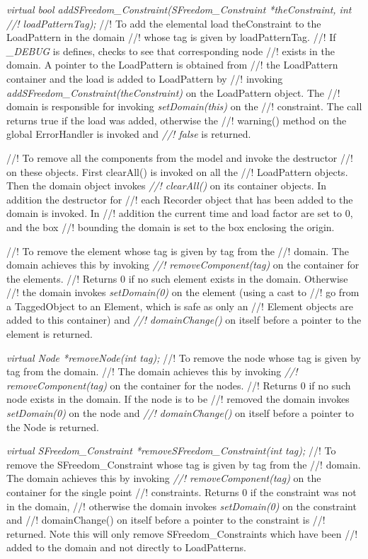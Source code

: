 {\em virtual bool addSFreedom\_Constraint(SFreedom\_Constraint *theConstraint, int
//! loadPatternTag);}    
//! To add the elemental load \p theConstraint to the LoadPattern in the domain
//! whose tag is given by \p loadPatternTag.
//! If {\em \_DEBUG} is defines, checks to see that corresponding node
//! exists in the domain. A pointer to the LoadPattern is obtained from
//! the LoadPattern container and the load is added to LoadPattern by
//! invoking {\em addSFreedom\_Constraint(theConstraint)} on the LoadPattern object. The
//! domain is responsible for invoking {\em setDomain(this)} on the
//! constraint. The call returns \p true if the load was added, otherwise the
//! warning() method on the global ErrorHandler is invoked and {\em
//! false} is returned. 


//! To remove all the components from the model and invoke the destructor
//! on these objects. First clearAll() is invoked on all the
//! LoadPattern objects. Then the domain object invokes {\em
//! clearAll()} on its container objects. In addition the destructor for
//! each Recorder object that has been added to the domain is invoked. In
//! addition the current time and load factor are set to $0$, and the box
//! bounding the domain is set to the box enclosing the origin. 


//! To remove the element whose tag is given by \p tag from the
//! domain. The domain achieves this by invoking {\em
//! removeComponent(tag)} on the container for the elements. 
//! Returns $0$ if no such element exists in the domain. Otherwise 
//! the domain invokes {\em setDomain(0)} on the element (using a cast to
//! go from a TaggedObject to an Element, which is safe as only an
//! Element objects are added to this container) and {\em
//! domainChange()} on itself before a pointer to the element is returned. 

{\em virtual Node *removeNode(int tag);}    
//! To remove the node whose tag is given by \p tag from the domain. 
//! The domain achieves this by invoking {\em
//! removeComponent(tag)} on the container for the nodes. 
//! Returns $0$ if no such node exists in the domain. If the node is to be
//! removed the domain invokes {\em setDomain(0)} on the node and {\em
//! domainChange()} on itself before a pointer to the Node is returned. 

{\em virtual SFreedom\_Constraint *removeSFreedom\_Constraint(int tag);}
//! To remove the SFreedom\_Constraint whose tag is given by \p tag from the
//! domain. The domain achieves this by invoking {\em
//! removeComponent(tag)} on the container for the single point
//! constraints. Returns $0$ if the constraint was not in the domain,
//! otherwise the domain invokes {\em setDomain(0)} on the constraint and
//! domainChange() on itself before a pointer to the constraint is
//! returned. Note this will only remove SFreedom\_Constraints which have been
//! added to the domain and not directly to LoadPatterns.

